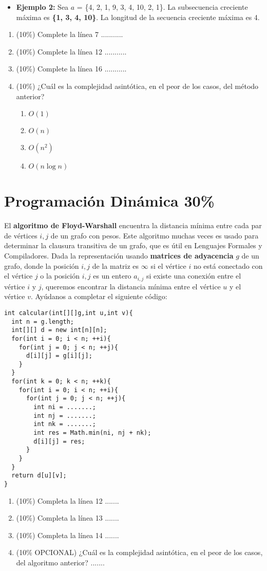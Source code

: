 \documentclass[10 pt]{article}
\begin{document}
\begin{multicols}{2}
\begin{itemize}
	\item \textbf{Ejemplo 2: } Sea $a$ = \{4, 2, 1, 9, 3, 4, 10, 2, 1\}. La subsecuencia creciente máxima es \textbf{\{1, 3, 4, 10\}}. La longitud de la secuencia creciente máxima es 4.
\end{itemize}

\begin{enumerate}[label=(\alph*)]
\item (10\%) Complete la línea 7  ...........
\item (10\%) Complete la línea 12 ...........
\item (10\%) Complete la línea 16 ...........
\item (10\%) ¿Cuál es la complejidad asintótica, en el peor de los casos, del método anterior?
\begin{enumerate}[label=(\roman*)]
\item $O(1)$
\item $O(n)$
\item $O(n^2)$
\item $O(n \log n)$
\end{enumerate}
\end{enumerate}
\section{Programación Dinámica 30\%}
El \textbf{algoritmo de Floyd-Warshall} encuentra la distancia mínima entre cada par de vértices $i, j$ de un grafo con pesos. Este algoritmo  muchas veces es usado para determinar la clausura transitiva de un grafo, que es útil en Lenguajes Formales y Compiladores. Dada la representación usando \textbf{matrices de adyacencia} $g$ de un grafo, donde la posición $i, j$ de la matriz es $\infty$ si el vértice $i$ no está conectado con el vértice $j$ o la posición $i, j$ es un entero $a_{i, j}$ si existe una conexión entre el vértice $i$ y $j$, queremos encontrar la distancia mínima entre el vértice $u$ y el vértice $v$. Ayúdanos a completar el siguiente código:
\begin{lstlisting}
int calcular(int[][]g,int u,int v){
  int n = g.length;
  int[][] d = new int[n][n];
  for(int i = 0; i < n; ++i){
	for(int j = 0; j < n; ++j){
	  d[i][j] = g[i][j];	
	}   
  }
  for(int k = 0; k < n; ++k){
	for(int i = 0; i < n; ++i){
	  for(int j = 0; j < n; ++j){
	    int ni = .......;
	    int nj = .......;
	    int nk = .......;
	    int res = Math.min(ni, nj + nk);
	    d[i][j] = res;
	  }	
	}  
  }
  return d[u][v];
}
\end{lstlisting}
\begin{enumerate}[label=(\alph*)]
\item (10\%) Completa la línea 12 .......
\item (10\%) Completa la línea 13 .......
\item (10\%) Completa la línea 14 .......
\item (10\% OPCIONAL) ¿Cuál es la complejidad asintótica, en el peor de los casos, del algoritmo anterior? .......
\end{enumerate}


\end{multicols}
\end{document}
